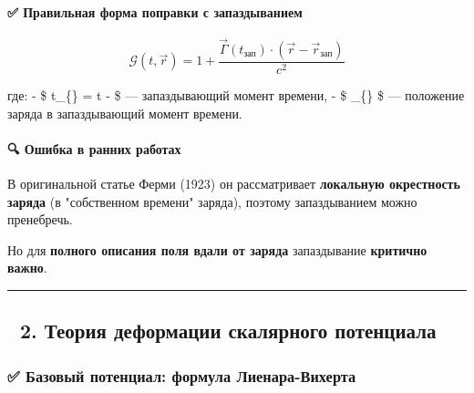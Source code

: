 \documentclass[11pt]{article}
\begin{document}
\paragraph{✅ Правильная форма поправки с
запаздыванием}\label{ux43fux440ux430ux432ux438ux43bux44cux43dux430ux44f-ux444ux43eux440ux43cux430-ux43fux43eux43fux440ux430ux432ux43aux438-ux441-ux437ux430ux43fux430ux437ux434ux44bux432ux430ux43dux438ux435ux43c}

\[
\boxed{
\mathcal{G}(t, \vec{r}) = 1 + \frac{\vec{\Gamma}(t_{\text{зап}}) \cdot (\vec{r} - \vec{r}_{\text{зап}})}{c^2}
}
\]

где: - \$ t\_\{\} = t -
 \$ --- запаздывающий момент
времени, - \$ \_\{\} \$ --- положение заряда в
запаздывающий момент времени.

\paragraph{🔍 Ошибка в ранних
работах}\label{ux43eux448ux438ux431ux43aux430-ux432-ux440ux430ux43dux43dux438ux445-ux440ux430ux431ux43eux442ux430ux445}

В оригинальной статье Ферми (1923) он рассматривает \textbf{локальную
окрестность заряда} (в "собственном времени" заряда), поэтому
запаздыванием можно пренебречь.

Но для \textbf{полного описания поля вдали от заряда} запаздывание
\textbf{критично важно}.

\begin{center}\rule{0.5\linewidth}{\linethickness}\end{center}

\subsection{🔹 2. Теория деформации скалярного
потенциала}\label{ux442ux435ux43eux440ux438ux44f-ux434ux435ux444ux43eux440ux43cux430ux446ux438ux438-ux441ux43aux430ux43bux44fux440ux43dux43eux433ux43e-ux43fux43eux442ux435ux43dux446ux438ux430ux43bux430}

\subsubsection{✅ Базовый потенциал: формула
Лиенара-Вихерта}\label{ux431ux430ux437ux43eux432ux44bux439-ux43fux43eux442ux435ux43dux446ux438ux430ux43b-ux444ux43eux440ux43cux443ux43bux430-ux43bux438ux435ux43dux430ux440ux430-ux432ux438ux445ux435ux440ux442ux430}
\end{document}

